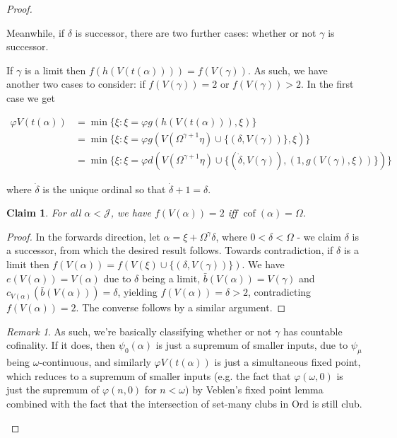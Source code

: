 \documentclass{article}
\theoremstyle{definition}
\theoremstyle{plain}
\theoremstyle{plain}
\theoremstyle{plain}
\theoremstyle{plain}
\theoremstyle{remark}
\newtheorem{remark}{Remark}
\theoremstyle{remark}
\theoremstyle{remark}
\theoremstyle{plain}
\theoremstyle{plain}
\newtheorem{claim}[definition]{Claim}
\begin{document}
\begin{proof}
\begin{enumerate}
\begin{enumerate}
\begin{enumerate}
\begin{enumerate}
                Meanwhile, if $\delta$ is successor, there are two further cases: whether or not $\gamma$ is successor.

                If $\gamma$ is a limit then $f(h(V(t(\alpha)))) = f(V(\gamma))$. As such, we have another two cases to consider: if $f(V(\gamma)) = 2$ or $f(V(\gamma)) > 2$. In the first case we get

                \begin{equation}
                \begin{split}
                \varphi V(t(\alpha)) & = \min\{\xi: \xi = \varphi g(h(V(t(\alpha))), \xi)\} \\ & = \min\{\xi: \xi = \varphi g(V(\Omega^{\gamma+1} \eta) \cup \{(\delta, V(\gamma))\}, \xi)\} \\ & = \min\{\xi: \xi = \varphi d(V(\Omega^{\gamma+1} \eta) \cup \{(\dot{\delta},V(\gamma)),(1,g(V(\gamma),\xi))\})\}
                \end{split}
                \end{equation}

                where $\dot{\delta}$ is the unique ordinal so that $\dot{\delta}+1 = \delta$.

                \begin{claim}
                For all $\alpha < \mathcal{J}$, we have $f(V(\alpha)) = 2$ iff $\operatorname{cof}(\alpha) = \Omega$.
                \end{claim}

                \begin{proof}
                In the forwards direction, let $\alpha = \xi + \Omega^\gamma \delta$, where $0 < \delta < \Omega$ - we claim $\delta$ is a successor, from which the desired result follows. Towards contradiction, if $\delta$ is a limit then $f(V(\alpha)) = f(V(\xi) \cup \{(\delta, V(\gamma))\})$. We have $e(V(\alpha)) = V(\alpha)$ due to $\delta$ being a limit, $\bar{b}(V(\alpha)) = V(\gamma)$ and $c_{V(\alpha)}(\bar{b}(V(\alpha))) = \delta$, yielding $f(V(\alpha)) = \delta > 2$, contradicting $f(V(\alpha)) = 2$. The converse follows by a similar argument.
                \end{proof}

                \begin{remark}
                As such, we're basically classifying whether or not $\gamma$ has countable cofinality. If it does, then $\psi_0(\alpha)$ is just a supremum of smaller inputs, due to $\psi_\mu$ being $\omega$-continuous, and similarly $\varphi V(t(\alpha))$ is just a simultaneous fixed point, which reduces to a supremum of smaller inputs (e.g. the fact that $\varphi(\omega, 0)$ is just the supremum of $\varphi(n, 0)$ for $n < \omega$) by Veblen's fixed point lemma combined with the fact that the intersection of set-many clubs in $\mathrm{Ord}$ is still club.
                \end{remark}


\end{enumerate}
\end{enumerate}
\end{enumerate}
\end{enumerate}
\end{proof}
\end{document}
